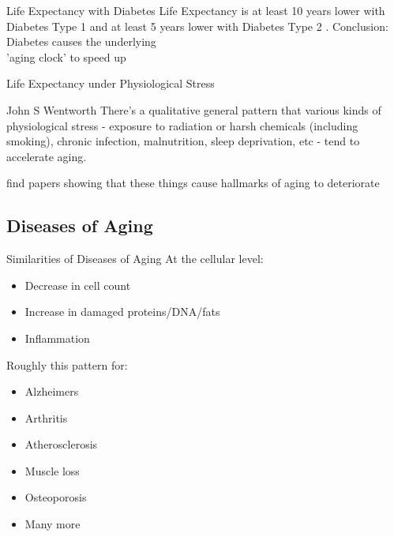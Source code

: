 \begin{frame}[c]{Life Expectancy with Diabetes}
    \large
    Life Expectancy is at least 10 years lower with Diabetes Type 1
    \cite{livingstone2015estimated} and at least 5 years lower with Diabetes Type
    2 \cite{untitled1:online}.
    \newline
    \newline
    \pause
    Conclusion: Diabetes causes the underlying \\ 'aging clock' to speed up
\end{frame}


\begin{frame}[c]{Life Expectancy under Physiological Stress}
    \large
    \begin{aquote}{John S Wentworth \cite{Homeosta76:online}}
    There's a qualitative general pattern that various kinds of physiological
        stress - exposure to radiation or harsh chemicals (including smoking),
        chronic infection, malnutrition, sleep deprivation, etc - tend to
        accelerate aging.
    \end{aquote}
    find papers showing that these things cause hallmarks of aging to deteriorate
\end{frame}


\subsection{Diseases of Aging}

\begin{frame}[c]{Similarities of Diseases of Aging}
    \large
    \cite{CorePath13:online}
    At the cellular level:
    \begin{itemize}[<+(1)->]
        \item Decrease in cell count
        \item Increase in damaged proteins/DNA/fats
        \item Inflammation
    \end{itemize}
    \pause

    Roughly this pattern for:
    \begin{multicols}{2}
    \begin{itemize}[<+(1)->]
        \item Alzheimers
        \item Arthritis
        \item Atherosclerosis
        \item Muscle loss
        \item Osteoporosis
        \item Many more
    \end{itemize}
    \end{multicols}
\end{frame}

